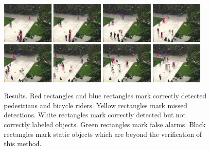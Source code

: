 \documentclass{mva2011}
\begin{document}
\begin{figure}
\centering
\includegraphics[width=0.23\textwidth,bb=0 0 720 576]{016.jpg}
\includegraphics[width=0.23\textwidth,bb=0 0 720 576]{026.jpg}
\includegraphics[width=0.23\textwidth,bb=0 0 720 576]{071.jpg}
\includegraphics[width=0.23\textwidth,bb=0 0 720 576]{116.jpg}\\
\includegraphics[width=0.23\textwidth,bb=0 0 720 576]{166.jpg}
\includegraphics[width=0.23\textwidth,bb=0 0 720 576]{251.jpg}
\includegraphics[width=0.23\textwidth,bb=0 0 720 576]{326.jpg}
\includegraphics[width=0.23\textwidth,bb=0 0 720 576]{366.jpg}
\caption{Results. Red rectangles and blue rectangles mark correctly detected pedestrians and bicycle riders. Yellow rectangles mark missed detections. White rectangles mark correctly detected but not correctly labeled objects. Green rectangles mark false alarms. Black rectangles mark static objects which are beyond the verification of this method.}
\label{fig:result}
\end{figure}
\end{document}
